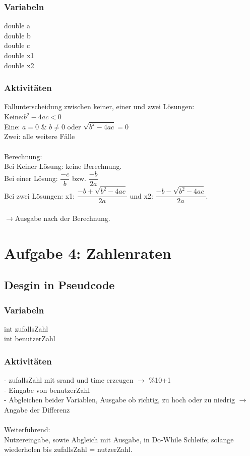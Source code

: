 \documentclass[10pt,a4paper]{report}
\begin{document}
	\subsubsection*{Variabeln}
	double a\\
	double b\\
	double c\\
	double x1\\
	double x2
	
	\subsubsection*{Aktivitäten}
	Fallunterscheidung zwischen keiner, einer und zwei Lösungen:\\
	Keine:$b^2 - 4ac < 0$\\
	Eine: $a = 0$ \& $b\neq0$ oder   $\sqrt{b^2 - 4ac} = 0$\\
	Zwei: alle weitere Fälle\\
	\\
	Berechnung:\\
	Bei Keiner Lösung: keine Berechnung.\\
	Bei einer Lösung: $ \dfrac{-c}{b} $ bzw. $\dfrac{-b}{2a} $\\
	Bei zwei Lösungen: x1: $\dfrac{-b + \sqrt{b^2 - 4ac}}{2a} $ und x2: $ \dfrac{-b - \sqrt{b^2 - 4ac}}{2a} $.\\
	\\
	$\longrightarrow$Ausgabe nach der Berechnung.
	
	\section*{Aufgabe 4: Zahlenraten}
	\subsection*{Desgin in Pseudcode}
	\subsubsection*{Variabeln}
	int zufallsZahl\\
	int benutzerZahl\\
	
	\subsubsection*{Aktivitäten}
	- zufallsZahl mit srand und time erzeugen $\rightarrow$ \%10+1\\
	- Eingabe von benutzerZahl\\
	- Abgleichen beider Variablen, Ausgabe ob richtig, zu hoch oder zu niedrig $\rightarrow$ Angabe der Differenz\\
	\\
	Weiterführend: \\
	Nutzereingabe, sowie Abgleich mit Ausgabe, in Do-While Schleife; solange wiederholen bis zufallsZahl = nutzerZahl.
	
	
\end{document}
